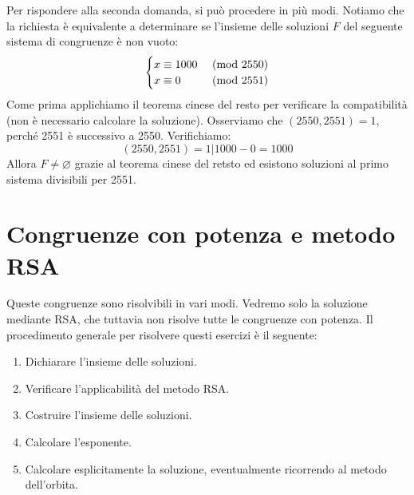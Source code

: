 \documentclass[oneside]{book}
\begin{document}
\begin{tcolorbox}[enhanced, breakable, colback=blue!30, colframe=blue!30!black, title=Esempio]
Per rispondere alla seconda domanda, si può procedere in più modi. Notiamo
che la richiesta è equivalente a determinare se l'insieme delle soluzioni
$F$ del seguente sistema di congruenze è non vuoto:
\[
\begin{cases}
    x\equiv 1000 &\ (\mathrm{mod}\ 2550)\\
    x\equiv 0    &\ (\mathrm{mod}\ 2551)
\end{cases}
\]
Come prima applichiamo il teorema cinese del resto per verificare la
compatibilità (non è necessario calcolare la soluzione). Osserviamo
che $(2550,2551)=1$, perché 2551 è successivo a 2550. Verifichiamo:
\[ (2550,2551)=1|1000-0=1000 \]
Allora $F\not=\varnothing$ grazie al teorema cinese del
retsto ed esistono soluzioni al primo sistema divisibili
per 2551.
\end{tcolorbox}


\newpage
\section{Congruenze con potenza e metodo RSA}
Queste congruenze sono risolvibili in vari modi. Vedremo solo la soluzione
mediante RSA, che tuttavia non risolve tutte le congruenze con potenza. Il
procedimento generale per risolvere questi esercizi è il seguente:
\begin{enumerate}
\item Dichiarare l'insieme delle soluzioni.
\item Verificare l'applicabilità del metodo RSA.
\item Costruire l'insieme delle soluzioni.
\item Calcolare l'esponente.
\item Calcolare esplicitamente la soluzione, eventualmente ricorrendo
al metodo dell'orbita.
\end{enumerate}
\end{document}
